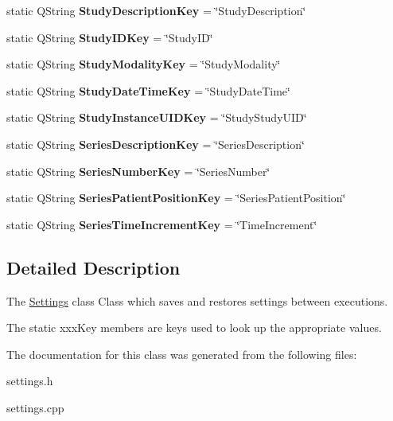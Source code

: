 \begin{DoxyCompactItemize}
\item 
\mbox{\label{class_settings_a000551ce2bc5b741e7910233a4a6fae6}} 
static Q\+String {\bfseries Study\+Description\+Key} = \char`\"{}Study\+Description\char`\"{}
\item 
\mbox{\label{class_settings_a5ab483f6086f888f699ca812e0b60ca9}} 
static Q\+String {\bfseries Study\+I\+D\+Key} = \char`\"{}Study\+ID\char`\"{}
\item 
\mbox{\label{class_settings_afa7f2cee01d025e612fd448fbc583986}} 
static Q\+String {\bfseries Study\+Modality\+Key} = \char`\"{}Study\+Modality\char`\"{}
\item 
\mbox{\label{class_settings_a3bb79fe2a421be94c6f845b8b8a0ce7a}} 
static Q\+String {\bfseries Study\+Date\+Time\+Key} = \char`\"{}Study\+Date\+Time\char`\"{}
\item 
\mbox{\label{class_settings_a5da5fb9d4aaaa84e6c56c5b63e36f283}} 
static Q\+String {\bfseries Study\+Instance\+U\+I\+D\+Key} = \char`\"{}Study\+Study\+U\+ID\char`\"{}
\item 
\mbox{\label{class_settings_a77972d6f417b106d7edc0f826cd4f0ce}} 
static Q\+String {\bfseries Series\+Description\+Key} = \char`\"{}Series\+Description\char`\"{}
\item 
\mbox{\label{class_settings_a689eb61798d61f0e1bc4cee562d857f1}} 
static Q\+String {\bfseries Series\+Number\+Key} = \char`\"{}Series\+Number\char`\"{}
\item 
\mbox{\label{class_settings_a8a6a8089b66079cdebff184f6e66398a}} 
static Q\+String {\bfseries Series\+Patient\+Position\+Key} = \char`\"{}Series\+Patient\+Position\char`\"{}
\item 
\mbox{\label{class_settings_af0e8f0337ae87adfaceaac445f82d4fd}} 
static Q\+String {\bfseries Series\+Time\+Increment\+Key} = \char`\"{}Time\+Increment\char`\"{}
\end{DoxyCompactItemize}


\subsection{Detailed Description}
The \hyperlink{class_settings}{Settings} class Class which saves and restores settings between executions. 

The static xxx\+Key members are keys used to look up the appropriate values. 

The documentation for this class was generated from the following files\+:\begin{DoxyCompactItemize}
\item 
settings.\+h\item 
settings.\+cpp\end{DoxyCompactItemize}

